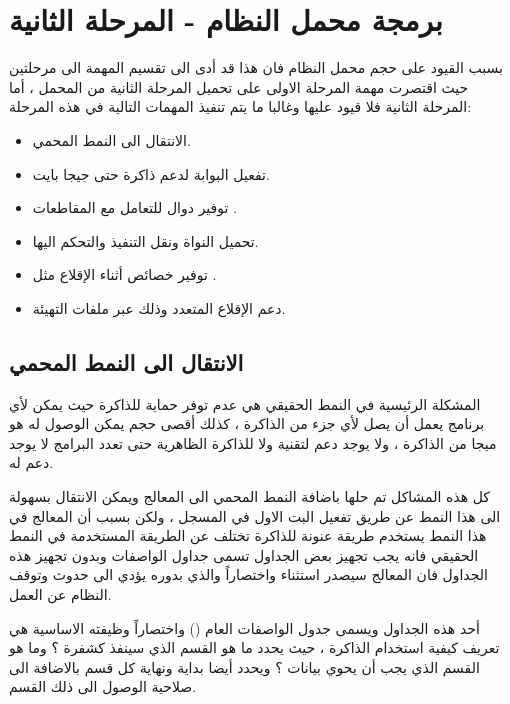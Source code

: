 \documentclass[document.tex]{subfiles}
\begin{document}
\chapter{برمجة محمل النظام - المرحلة الثانية}
بسبب القيود على حجم محمل النظام فان هذا قد أدى الى تقسيم المهمة الى مرحلتين حيث اقتصرت مهمة المرحلة الاولى على تحميل المرحلة الثانية من المحمل ، أما المرحلة الثانية  فلا قيود عليها وغالبا ما يتم تنفيذ المهمات التالية في هذه المرحلة:
\begin{itemize}
\item الانتقال الى النمط المحمي.
\item تفعيل البوابة  لدعم ذاكرة حتى  جيجا بايت.
\item توفير دوال للتعامل مع المقاطعات .
\item  تحميل النواة ونقل التنفيذ والتحكم اليها.
\item توفير خصائص أثناء الإقلاع مثل .
\item دعم الإقلاع المتعدد  وذلك عبر ملفات التهيئة.

\end{itemize}

\section{الانتقال الى النمط المحمي}
المشكلة الرئيسية في النمط الحقيقي  هي عدم توفر حماية للذاكرة حيث يمكن لأي برنامج يعمل أن يصل لأي جزء من الذاكرة ، كذلك أقصى حجم يمكن الوصول له هو  ميجا من الذاكرة ، ولا يوجد دعم لتقنية  ولا للذاكرة الظاهرية  حتى تعدد البرامج لا يوجد دعم له.

كل هذه المشاكل تم حلها باضافة النمط المحمي الى المعالج ويمكن الانتقال بسهولة الى هذا النمط عن طريق تفعيل البت الاول في المسجل  ، ولكن بسبب أن المعالج في هذا النمط يستخدم طريقة عنونة للذاكرة تختلف عن الطريقة المستخدمة في النمط الحقيقي فانه يجب تجهيز بعض الجداول تسمى جداول الواصفات  وبدون تجهيز هذه الجداول فان المعالج سيصدر استثناء  واختصاراً  والذي بدوره يؤدي الى حدوث  وتوقف النظام عن العمل.

أحد هذه الجداول ويسمى جدول الواصفات العام  () واختصاراً  وظيفته الاساسية هي تعريف كيفية استخدام الذاكرة ، حيث يحدد ما هو القسم الذي سينفذ كشفرة ؟ وما هو القسم الذي يجب أن يحوي بيانات ؟ ويحدد أيضا بداية ونهاية كل قسم بالاضافة الى صلاحية الوصول الى ذلك القسم.
\end{document}
